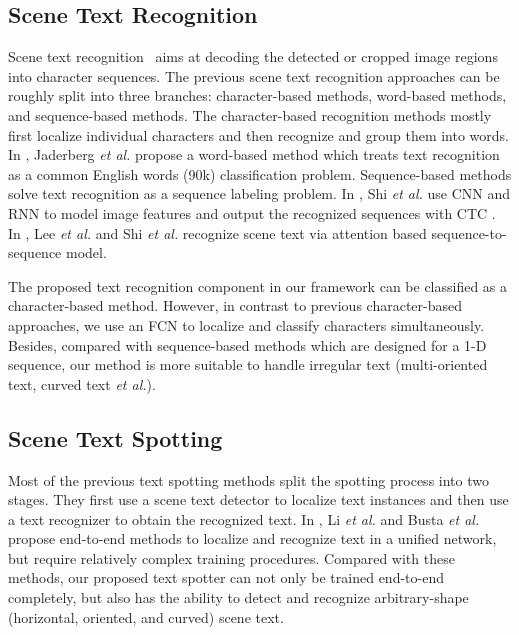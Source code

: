 \documentclass[runningheads]{llncs}
\begin{document}
\subsection{Scene Text Recognition}

Scene text recognition~\cite{yao2014strokelets,shi2018aster} aims at decoding the detected or cropped image regions into character sequences. The previous scene text recognition approaches can be roughly split into three branches: character-based methods, word-based methods, and sequence-based methods. The character-based recognition methods \cite{bissacco2013photoocr,jaderberg2014deep} mostly first localize individual characters and then recognize and group them into words. In \cite{Jaderberg14c}, Jaderberg \emph{et al.} propose a word-based method which treats text recognition as a common English words (90k) classification problem. Sequence-based methods solve text recognition as a sequence labeling problem. In \cite{shi2017end}, Shi \emph{et al.} use CNN and RNN to model image features and output the recognized sequences with CTC \cite{graves2006connectionist}. In \cite{lee2016recursive,shi2016robust}, Lee \emph{et al.} and Shi \emph{et al.} recognize scene text via attention based sequence-to-sequence model.

The proposed text recognition component in our framework can be classified as a character-based method. However, in contrast to previous character-based approaches, we use an FCN \cite{long2015fully} to localize and classify characters simultaneously. Besides, compared with sequence-based methods which are designed for a 1-D sequence, our method is more suitable to handle irregular text (multi-oriented text, curved text \emph{et al.}).

\subsection{Scene Text Spotting}

Most of the previous text spotting methods \cite{jaderberg2016reading,liao2017textboxes,SynthText,liao2018textboxes++} split the spotting process into two stages. They first use a scene text detector \cite{jaderberg2016reading,liao2017textboxes,liao2018textboxes++} to localize text instances and then use a text recognizer \cite{Jaderberg14c,shi2017end} to obtain the recognized text. In \cite{Li_2017_ICCV,Busta_2017_ICCV}, Li \emph{et al.} and Busta \emph{et al.} propose end-to-end methods to localize and recognize text in a unified network, but require relatively complex training procedures. Compared with these methods, our proposed text spotter can not only be trained end-to-end completely, but also has the ability to detect and recognize  arbitrary-shape (horizontal, oriented, and curved) scene text.
\end{document}
